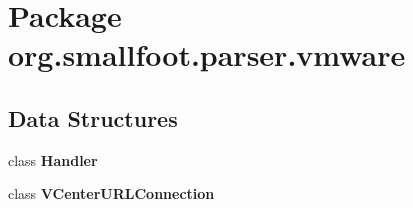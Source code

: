 \section{Package org.\+smallfoot.\+parser.\+vmware}
\label{namespaceorg_1_1smallfoot_1_1parser_1_1vmware}
\subsection*{Data Structures}
\begin{DoxyCompactItemize}
\item 
class {\bf Handler}
\item 
class {\bf V\+Center\+U\+R\+L\+Connection}
\end{DoxyCompactItemize}
